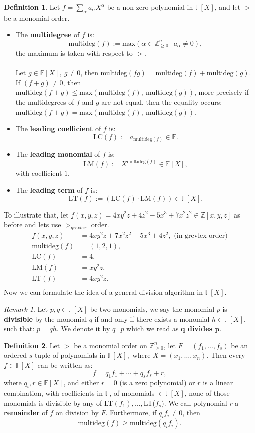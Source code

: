 \documentclass[thesis=M,english]{FITthesis}[2012/10/20]
\theoremstyle{remark}
\newtheorem*{RM}{Remark}
\theoremstyle{definition}
\newtheorem{DF}{Definition}[section]
\begin{document}
\begin{DF}
Let $f = \sum_\alpha a_\alpha X^\alpha$ be a non-zero polynomial in $\mathbb{F}[X]$, and let $>$ be a monomial order.
\begin{itemize}
\item The \textbf{multidegree} of $f$ is:
$$
\text{multideg}(f) := \text{max}(\alpha \in \mathbb{Z}_{\geq 0}^n\ |\ a_\alpha \neq 0),
$$
the maximum is taken with respect to $>$.\\ \\
Let $g \in \mathbb{F}[X],\ g \neq 0$, then multideg$(fg) = \text{multideg}(f) + \text{multideg}(g)$. If $(f + g) \neq 0$, then $\text{multideg}(f + g) \leq \text{max}(\text{multideg}(f),\ \text{multideg}(g))$, more precisely if the multidegrees of $f$ and $g$ are not equal, then the equality occurs: $\text{multideg}(f + g) = \text{max}(\text{multideg}(f),\ \text{multideg}(g))$.
\item The \textbf{leading coefficient} of $f$ is:
$$
\text{LC}(f) := a_{\text{multideg}(f)} \in \mathbb{F}.
$$
\item The \textbf{leading monomial} of $f$ is:
$$
\text{LM}(f) := X^{\text{multideg}(f)} \in \mathbb{F}[X],
$$
with coefficient $1$.
\item The \textbf{leading term} of $f$ is:
$$
\text{LT}(f) := (\text{LC}(f)\cdot \text{LM}(f)) \in \mathbb{F}[X].
$$
\end{itemize}
\end{DF}
\noindent To illustrate that, let $f(x,y,z) = 4xy^2z + 4z^2 - 5x^3 + 7x^2z^2 \in \mathbb{Z}[x,y,z]$ as before and lets use $>_{grevlex}$ order.
\begin{align*}
f(x,y,z) &= 4xy^2z + 7x^2z^2  -5x^3 + 4z^2, \text{ (in  grevlex order)}\\
\text{multideg}(f)&=(1,2,1), \\
\text{LC}(f)&=4, \\
\text{LM}(f)&=xy^2z, \\
\text{LT}(f)&=4xy^2z. \\
\end{align*}
Now we can formulate the idea of a general division algorithm in $\mathbb{F}[X]$.
\begin{RM}
Let $p, q \in \mathbb{F}[X]$ be two monomials, we say the monomial $p$ is \textbf{divisible} by the monomial $q$ if and only if there exists a monomial $h \in \mathbb{F}[X]$, such that: $p = qh$. We denote it by $q\ |\ p$ which we read  as \textbf{$\mathbf{q}$ divides $\mathbf{p}$}.
\end{RM}
\begin{DF}
Let $>$ be a monomial order on $\mathbb{Z}_{\geq 0}^n$, let $F = (f_1, \ldots, f_s)$ be an ordered $s$-tuple of polynomials in $\mathbb{F}[X],$ where $X = (x_1, \ldots, x_n)$. Then every $f \in \mathbb{F}[X]$ can be written as:
$$
f = q_1f_1 + \cdots + q_sf_s + r,
$$
where $q_i, r \in \mathbb{F}[X]$, and either $r = 0$ (is a zero polynomial) or $r$ is a linear combination, with coefficients in $\mathbb{F}$, of monomials $\in \mathbb{F}[X]$, none of those monomials is divisible by any of LT$(f_1), \ldots,$LT($f_s$).
We call polynomial $r$ a \textbf{remainder} of $f$ on division by $F$. Furthermore, if $q_if_i \neq 0$, then
$$
\text{multideg}(f) \geq \text{multideg}(q_if_i).
$$
\end{DF}
\end{document}
